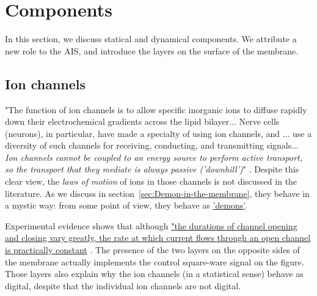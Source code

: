 
\section{Components\label{sec:Single-Components}}

In this section, we discuss statical and dynamical
components. We attribute a new role to the 
\gls{AIS}, and introduce the layers on the surface of the membrane.



\subsection{Ion channels\label{sec:Single-Ion-Channels}}


"The function of ion channels is to allow specific inorganic ions
to diffuse rapidly down their electrochemical gradients across the lipid bilayer...
Nerve cells (neurons), in particular, have made a specialty of using ion channels,
and ... use a diversity of such channels for receiving, conducting, and transmitting signals...
\textit{Ion channels cannot be coupled to an energy source to perform active transport,
so the transport that they mediate is always passive ('downhill')}" \cite{MolecularBiology:2002}.
Despite this clear view, the \textit{laws of motion} of ions in those
channels is not discussed in the literature. As we discuss
in section~\ref{sec:Demon-in-the-membrane}, they behave in a mystic way: from some point of view, they behave as 
\hyperlink{Maxwell-demon}{'demons'}.

Experimental evidence shows that although
\href{https://www.ncbi.nlm.nih.gov/books/NBK26910/bin/ch11f32.gif}
{"the durations of channel opening and closing vary greatly,
	the rate at which current flows through an open channel is practically constant} \cite{MolecularBiology:2002}.
The presence of the two layers on the opposite sides of the membrane
actually implements the control square-ware signal on the figure.
Those layers also explain why the ion channels (in a statistical sense)
behave as digital, despite that the individual ion channels are not digital.


